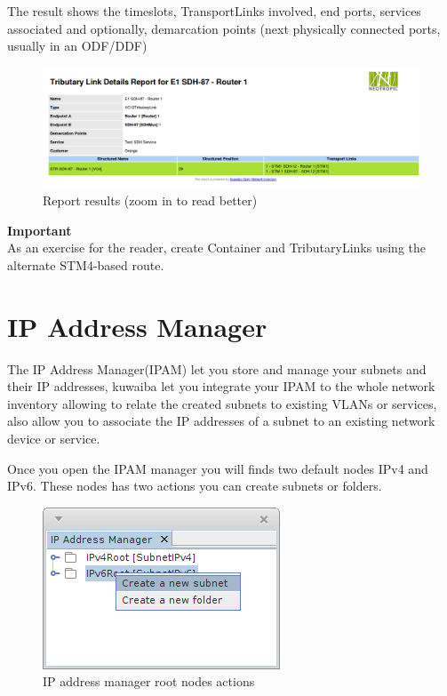 \documentclass[a4paper]{article}
\begin{document}
		The result shows the timeslots, TransportLinks involved, end ports, services associated and optionally, demarcation points (next physically connected ports, usually in an ODF/DDF)
		\begin{figure}[h!]
			\centering
			\includegraphics[width=\linewidth]{img/sdh_module_tributary_link_report.png}
			\caption{Report results (zoom in to read better)}
			\label{fig:sdh_module_tributary_link_report}
			\end{figure}
		
		\begin{framed} {\large \textbf{Important}}\\
			As an exercise for the reader, create Container and TributaryLinks using the alternate STM4-based route.
		\end{framed}	
		
		\newpage
		\section{IP Address Manager}\label{sec:ip_address_manager}
		The IP Address Manager(IPAM) let you store and manage your subnets and their IP addresses, kuwaiba let you integrate your IPAM to the whole network inventory allowing to relate the created subnets to existing VLANs or services, also allow you to associate the IP addresses of a subnet to an existing network device or service.
		
		Once you open the IPAM manager you will finds two default nodes IPv4 and IPv6.
		These nodes has two actions you can create subnets or folders.
		\begin{figure}[h!]
			\centering
			\includegraphics[width=0.4\linewidth]{img/ipam_root_nodes_actions.png}
			\caption{IP address manager root nodes actions}
			\label{fig:ipam_root_nodes_actions}
		\end{figure}
		
\end{document}
